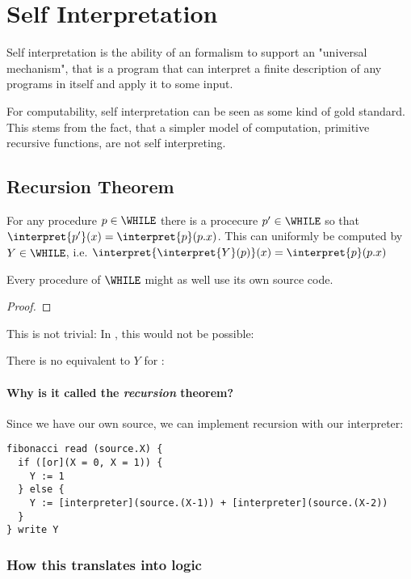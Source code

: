 \section{Self Interpretation}
\label{sec:self}
Self interpretation is the ability of an formalism to support an
"universal mechanism", that is a program that can interpret a finite
description of any programs in itself and apply it to some input.

For computability, self interpretation can be seen as some kind of gold
standard\citationneeded. This stems from the fact, that a simpler model of
computation, primitive recursive functions, are not self interpreting.

\subsection{Recursion Theorem}
\begin{theorem}
	For any procedure $p\in \WHILE$ there is a procecure $p'\in \WHILE$ so 
	that $\interpret{p'}(x) = \interpret{p}(p.x)$. This can uniformly be 
	computed by $Y\in \WHILE$, i.e. $\interpret{\interpret{Y}(p)}(x) = \interpret{p}(p.x)$

	Every procedure of $\WHILE$ might as well use its own source code.
\end{theorem}
\begin{proof}

\end{proof}

This is not trivial: In \FOR, this would not be possible: 
\begin{example}
	There is no equivalent to $Y$ for \FOR:
\end{example}

\paragraph{Why is it called the {\em recursion} theorem?}
Since we have our own source, we can implement recursion with our interpreter:
\begin{verbatim}
fibonacci read (source.X) {
  if ([or](X = 0, X = 1)) {
    Y := 1
  } else {
    Y := [interpreter](source.(X-1)) + [interpreter](source.(X-2))
  }
} write Y
\end{verbatim}

\subsubsection{How this translates into logic}

